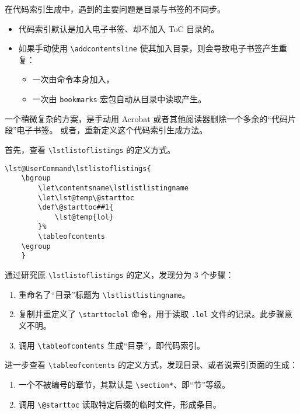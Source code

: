 \documentclass[../Main/thesis.tex]{subfiles}
\begin{document}
在代码索引生成中，遇到的主要问题是目录与书签的不同步。
\begin{itemize}[\textbullet]
  \item 代码索引默认是加入电子书签、却不加入 ToC 目录的。
  \item 如果手动使用 \texttt{\textbackslash addcontentsline} 使其加入目录，则会导致电子书签产生重复：
  \begin{itemize}[$\circ$]
    \item 一次由命令本身加入，
    \item 一次由 \texttt{bookmarks} 宏包自动从目录中读取产生。
  \end{itemize}
\end{itemize}

一个稍微复杂的方案，是手动用 Acrobat 或者其他阅读器删除一个多余的“代码片段”电子书签。
或者，重新定义这个代码索引生成方法。

首先，查看 \texttt{\textbackslash lstlistoflistings} 的定义方式。

\begin{lstlisting}[language=TongjiLaTeX,
  caption=原 lstlistoflistings 定义,
  style=colorEX]
% listings.sty 中的定义
\lst@UserCommand\lstlistoflistings{
    \bgroup
        \let\contentsname\lstlistlistingname
        \let\lst@temp\@starttoc
        \def\@starttoc##1{
            \lst@temp{lol}
        }%
        \tableofcontents
    \egroup
    }
\end{lstlisting}

通过研究原 \texttt{\textbackslash lstlistoflistings} 的定义，发现分为 3 个步骤：
\begin{enumerate}[(1)]
  \item 重命名了“目录”标题为 \texttt{\textbackslash lstlistlistingname}。
  \item 复制并重定义了 \texttt{\textbackslash starttoc{lol}} 命令，用于读取 \texttt{.lol} 文件的记录。此步骤意义不明。
  \item 调用 \texttt{\textbackslash tableofcontents} 生成“目录”，即代码索引。
\end{enumerate}

进一步查看 \texttt{\textbackslash tableofcontents} 的定义方式，发现目录、或者说索引页面的生成：
\begin{enumerate}[(1)]
  \item 一个不被编号的章节，其默认是 \texttt{\textbackslash section*}、即“节”等级。
  \item 调用 \texttt{\textbackslash @starttoc} 读取特定后缀的临时文件，形成条目。
\end{enumerate}
\end{document}

